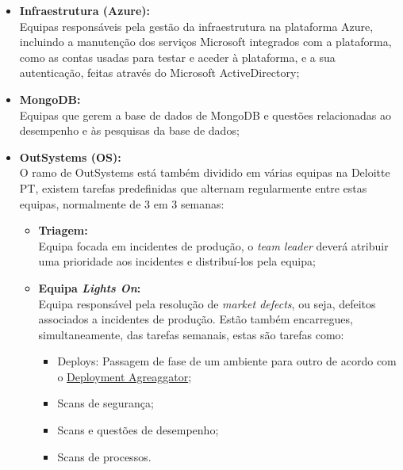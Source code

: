                 \begin{itemize}
                    \item \textbf{Infraestrutura (Azure):} \\
                    Equipas responsáveis pela gestão da infraestrutura na plataforma Azure, incluindo a manutenção dos serviços Microsoft integrados com a plataforma, como as contas usadas para testar e aceder à plataforma, e a sua autenticação, feitas através do Microsoft ActiveDirectory;
                    \item \textbf{MongoDB:} \\
                    Equipas que gerem a base de dados de MongoDB e questões relacionadas ao desempenho e às pesquisas da base de dados;
                    \item \textbf{OutSystems (OS):} \\
                    O ramo de OutSystems está também dividido em várias equipas na Deloitte PT, existem tarefas predefinidas que alternam regularmente entre estas equipas, normalmente de 3 em 3 semanas:
                    
                    \begin{itemize}
                        \item \textbf{Triagem:} \\
                        Equipa focada em incidentes de produção, o \textit{team leader} deverá atribuir uma prioridade aos incidentes e distribuí-los pela equipa;
                        
                        \item \textbf{Equipa \textit{Lights On}:} \\
                        Equipa responsável pela resolução de \textit{market defects}, ou seja, defeitos associados a incidentes de produção. Estão também encarregues, simultaneamente, das tarefas semanais, estas são tarefas como:
                        \begin{itemize}
                            \item Deploys: Passagem de fase de um ambiente para outro de acordo com o \hyperref[fig:deployment-aggregator]{Deployment Agreaggator};
                            \item Scans de segurança;
                            \item Scans e questões de desempenho;
                            \item Scans de processos.
                        \end{itemize}
                        

\end{itemize}
\end{itemize}

